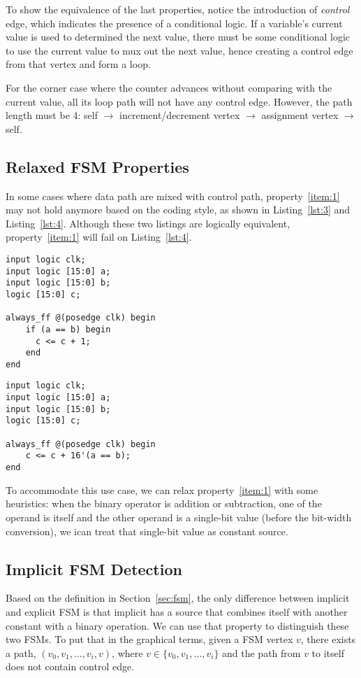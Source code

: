 \documentclass{article}
\begin{document}
To show the equivalence of the last properties, notice the introduction of \textit{control}
edge, which indicates the presence of a conditional logic. If a variable's current value
is used to determined the next value, there must be some conditional logic to use the
current value to mux out the next value, hence creating a control edge from that vertex
and form a loop.

For the corner case where the counter advances without comparing with the current
value, all its loop path will not have any control edge. However, the path length
must be 4: self $\rightarrow$ increment/decrement vertex $\rightarrow$ assignment vertex
$\rightarrow$ self.

\subsection{Relaxed FSM Properties}
In some cases where data path are mixed with control path, property~\ref{item:1} may not
hold anymore based on the coding style, as shown in Listing~\ref{lst:3} and Listing~\ref{lst:4}. Although these
two listings are logically equivalent, property~\ref{item:1} will fail on Listing~\ref{lst:4}.

\begin{lstlisting}[style={verilog-style}, caption={Conditional increment counter
    with constant source},
    label={lst:3}]
input logic clk;
input logic [15:0] a;
input logic [15:0] b;
logic [15:0] c;

always_ff @(posedge clk) begin
    if (a == b) begin
      c <= c + 1;
    end
end
\end{lstlisting}

\begin{lstlisting}[style={verilog-style}, caption={Conditional increment counter
    with constant source},
    label={lst:4}]
input logic clk;
input logic [15:0] a;
input logic [15:0] b;
logic [15:0] c;

always_ff @(posedge clk) begin
    c <= c + 16'(a == b);
end
\end{lstlisting}

To accommodate this use case, we can relax property~\ref{item:1} with some heuristics:
when the binary operator is addition or subtraction, one of the operand is itself and the
other operand is a single-bit value (before the bit-width conversion), we ican treat that
single-bit value as constant source.

\subsection{Implicit FSM Detection}
Based on the definition in Section~\ref{sec:fsm}, the only difference between implicit and
explicit FSM is that implicit has a source that combines itself with another constant with
a binary operation. We can use that property to distinguish these two FSMs. To put that
in the graphical terms, given a FSM vertex $v$, there exists a path,
$(v_0, v_1, \dots, v_i, v)$, where $v \in \{v_0, v_1, \dots, v_i\}$ and the path from $v$
to itself does not contain control edge.
\end{document}
